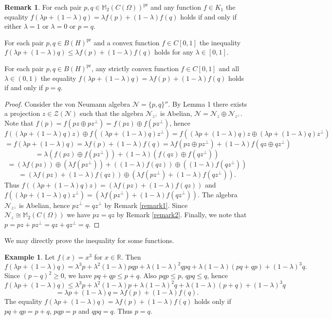 \documentclass[
11pt,%
tightenlines,%
twoside,%
onecolumn,%
nofloats,%
nobibnotes,%
nofootinbib,%
superscriptaddress,%
noshowpacs,%
centertags]%
{revtex4}
\theoremstyle{definition}
\newtheorem{remark}{Remark}
\newtheorem{example}{Example} %
\begin{document}
\begin{remark}\label{remark3}
For each pair $p, q\in \mathbb{M}_2(C(\Omega))^{\mathrm{pr}}$ and
any  function $f\in K_1$  the equality $f(\lambda p
+(1-\lambda)q)=\lambda f(p)+(1-\lambda) f(q)$ holds if and only if
either $\lambda=1$ or $\lambda=0$ or $p=q$.
\end{remark}

\begin{corollary}\label{cor1}
For each pair $p, q\in B(H)^\mathrm{pr}$ and a
 convex function $f\in C[0,1]$ the inequality
$f(\lambda p + (1-\lambda) q)\leq \lambda f(p)+(1-\lambda)f(q)$
holds for any $\lambda\in[0,1]$.
\end{corollary}

\begin{corollary}
For each pair  $p, q\in B(H)^\mathrm{pr}$, any
 strictly convex function $f\in C[0,1]$ and all $\lambda\in (0,1)$ the equality
$f(\lambda p +(1-\lambda)q)= \lambda f(p)+ (1-\lambda)f(q)$
holds if and only if $p=q$.
\end{corollary}
\begin{proof}
Consider the von Neumann algebra $\mathcal{N}=\{p,q\}''$. By Lemma 1
there exists a
 projection $z\in \mathcal{Z}(\mathcal{N})$ such
 that the algebra $\mathcal{N}_{z^\perp}$ is Abelian,
$\mathcal{N}=\mathcal{N}_{z}\oplus \mathcal{N}_{z^\perp}$.
 Note that $f(p)=f(pz\oplus pz^\perp)=f(pz)\oplus f(pz^\perp)$, hence
$$
f((\lambda p +(1-\lambda)q)z)\oplus f((\lambda p
+(1-\lambda)q)z^\perp) =f((\lambda p +(1-\lambda)q)z\oplus (\lambda
p +(1-\lambda)q)z^\perp)
$$
$$
=f(\lambda p +(1-\lambda)q)= \lambda f(p)+ (1-\lambda)f(q)= \lambda
f(pz\oplus pz^\perp)+ (1-\lambda)f(qz\oplus qz^\perp)
$$
$$
=\lambda (f(pz)\oplus f(pz^\perp))+ (1-\lambda)(f(qz)\oplus
f(qz^\perp))
$$
$$
= (\lambda f(pz))\oplus (\lambda f(pz^\perp))+
((1-\lambda)f(qz))\oplus ((1-\lambda) f(qz^\perp))
$$
$$
=(\lambda f(pz)+(1-\lambda)f(qz))\oplus (\lambda f(pz^\perp)+(1-\lambda) f(qz^\perp)).
$$
Thus $f((\lambda p +(1-\lambda)q)z)=(\lambda f(pz)+(1-\lambda)f(qz))$
and
$
f((\lambda p +(1-\lambda)q)z^\perp)=(\lambda f(pz^\perp)+(1-\lambda) f(qz^\perp)).
$
The algebra $\mathcal{N}_{z^\perp}$ is Abelian, hence $pz^\perp=qz^\perp$
 by Remark \ref{remark1}.
Since $\mathcal{N}_z \cong \mathbb{M}_2(C(\Omega))$ we have $pz=qz$
by Remark \ref{remark2}. Finally, we note that $p=pz+pz^\perp=qz+qz^\perp=q$.
\end{proof}

We may directly prove the inequality for some functions.

\begin{example}
Let $f(x)=x^3$ for $x \in \mathbb{R}$. Then
$$
f(\lambda p+(1-\lambda)q)=\lambda^3 p+\lambda^2(1-\lambda)pqp+\lambda(1-\lambda)^2 qpq +\lambda(1-\lambda)(pq+qp)+(1-\lambda)^3q.
$$
Since $(p-q)^2\geq 0$, we have $pq+qp\leq p+q$. Also $pqp\leq p$, $qpq\leq q$,
hence
 $$
f(\lambda p+(1-\lambda)q)\leq
 \lambda^3 p+\lambda^2(1-\lambda)p+\lambda(1-\lambda)^2 q +\lambda(1-\lambda)(p+q)+(1-\lambda)^3q
$$
$$
=\lambda p +(1-\lambda)q=\lambda f(p)+(1-\lambda)f(q).
$$
The equality
$f(\lambda p+(1-\lambda)q)=\lambda f(p)+(1-\lambda)f(q)$
holds only if $pq+qp=p+q$, $pqp=p$ and $qpq=q$.  Thus $p=q$.
\end{example}
\end{document}
